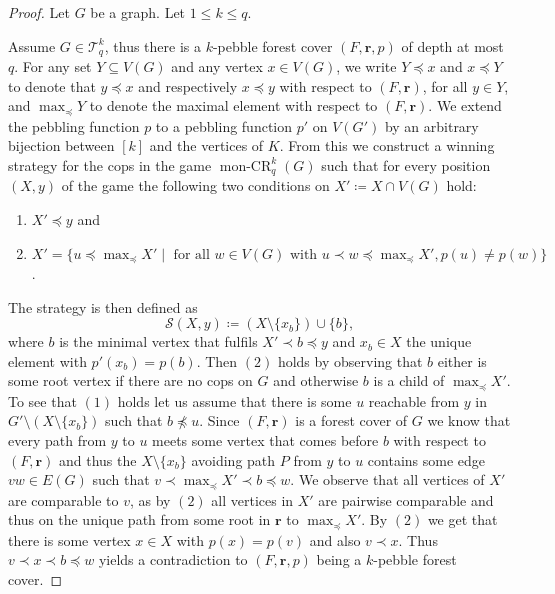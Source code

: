 \documentclass[10pt,a4paper]{article}
\newcommand{\Ekq}{\ensuremath{\mathcal{T}_{q}^{k}}}
\DeclareMathOperator{\monCR}{mon-CR}
\renewcommand{\vec}[1]{\ensuremath{\boldsymbol{#1}}}
\begin{document}
\begin{proof}
	Let $G$ be a graph. Let $1\leq k\leq q$.
	
	Assume $G\in\Ekq$, thus there is a $k$-pebble forest cover $(F,\vec{r},p)$ of depth at most $q$.
	For any set $Y\subseteq V(G)$ and any vertex $x\in V(G)$, we write $Y\preceq x$ and $x\preceq Y$ to denote that $y\preceq x$ and respectively $x\preceq y$ with respect to $(F,\vec{r})$, for all $y\in Y$, and $\max_{\preceq}Y$ to denote the maximal element with respect to $(F,\vec{r})$.
	We extend the pebbling function $p$ to a pebbling function $p'$ on $V(G')$ by an arbitrary bijection between $[k]$ and the vertices of $K$.
	From this we construct a winning strategy for the cops in the game $\monCR_q^k(G)$ such that for every position $(X,y)$ of the game the following two conditions on $X'\coloneqq X\cap V(G)$ hold:
	\begin{enumerate}
		\item $X'\preceq y$ and
		\item $X'=\{u\preceq \max_{\preceq} X'\mid \text{ for all } w\in V(G) \text{ with }u\prec w\preceq \max_{\preceq} X', p(u)\neq p(w) \}$.
	\end{enumerate}
	The strategy is then defined as
	\begin{equation*}
	\mathcal{S}(X,y)\coloneqq \left(X\setminus \{x_b\}\right)\cup \{b\},
	\end{equation*}
	where $b$ is the minimal vertex that fulfils $X'\prec b\preceq y$ and $x_b\in X$ the unique element with $p'(x_b)=p(b)$.
	Then $(2)$ holds by observing that $b$ either is some root vertex if there are no cops on $G$ and otherwise $b$ is a child of $\max_{\preceq} X'$.
	To see that $(1)$ holds let us assume that there is some $u$ reachable from $y$ in $G'\setminus \left(X\setminus\{x_b\}\right)$ such that $b\not\preceq u$.
	Since $(F,\vec{r})$ is a forest cover of $G$ we know that every path from $y$ to $u$ meets some vertex that comes before $b$ with respect to $(F,\vec{r})$ and thus the $X\setminus\{x_b\}$ avoiding path $P$ from $y$ to $u$ contains some edge $vw\in E(G)$ such that $v\prec \max_{\preceq} X' \prec b \preceq w$.
	We observe that all vertices of $X'$ are comparable to $v$, as by $(2)$ all vertices in $X'$ are pairwise comparable and thus on the unique path from some root in $\vec{r}$ to $\max_{\preceq} X'$.
	By $(2)$ we get that there is some vertex $x\in X$ with $p(x)=p(v)$ and also $v\prec x$.
	Thus $v\prec x\prec b\preceq w$ yields a contradiction to $(F,\vec{r},p)$ being a $k$-pebble forest cover.
	

\end{proof}
\end{document}
